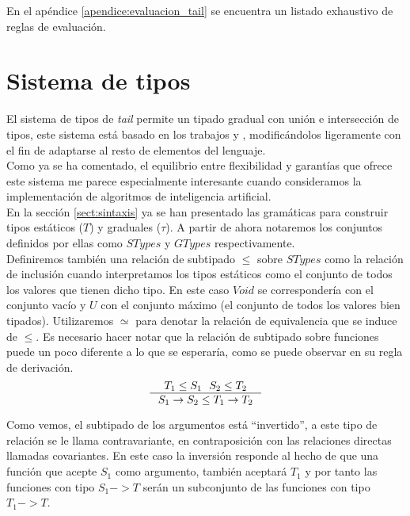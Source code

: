 En el apéndice \ref{apendice:evaluacion_tail} se encuentra un listado exhaustivo de reglas de evaluación.\\


\section{Sistema de tipos}

El sistema de tipos de \textit{tail} permite un tipado gradual con unión e intersección de tipos, este sistema está basado en los trabajos \cite{castagna_gradual_2017} y \cite{ranzato_gradual_2017}, modificándolos ligeramente con el fin de adaptarse al resto de elementos del lenguaje.\\

Como ya se ha comentado, el equilibrio entre flexibilidad y garantías que ofrece este sistema me parece especialmente interesante cuando consideramos la implementación de algoritmos de inteligencia artificial.\\

En la sección \ref{sect:sintaxis} ya se han presentado las gramáticas para construir tipos estáticos ($T$) y graduales ($\tau$). A partir de ahora notaremos los conjuntos definidos por ellas como $STypes$ y $GTypes$ respectivamente.\\

Definiremos también una relación de subtipado $\leq$ sobre $STypes$ como la relación de inclusión cuando interpretamos los tipos estáticos como el conjunto de todos los valores que tienen dicho tipo. En este caso $Void$ se correspondería con el conjunto vacío y $U$ con el conjunto máximo (el conjunto de todos los valores bien tipados). Utilizaremos $\simeq$ para denotar la relación de equivalencia que se induce de $\leq$.
Es necesario hacer notar que la relación de subtipado sobre funciones puede un poco diferente a lo que se esperaría, como se puede observar en su regla de derivación.\\
\[
  \inference{T_1 \leq S_1\ \ S_2 \leq T_2}{S_1 -> S_2 \leq T_1 -> T_2}
\]

Como vemos, el subtipado de los argumentos está ``invertido'', a este tipo de relación se le llama contravariante, en contraposición con las relaciones directas llamadas covariantes. En este caso la inversión responde al hecho de que una función que acepte $S_1$ como argumento, también aceptará $T_1$ y por tanto las funciones con tipo $S_1 -> T$ serán un subconjunto de las funciones con tipo $T_1 -> T$.\\

